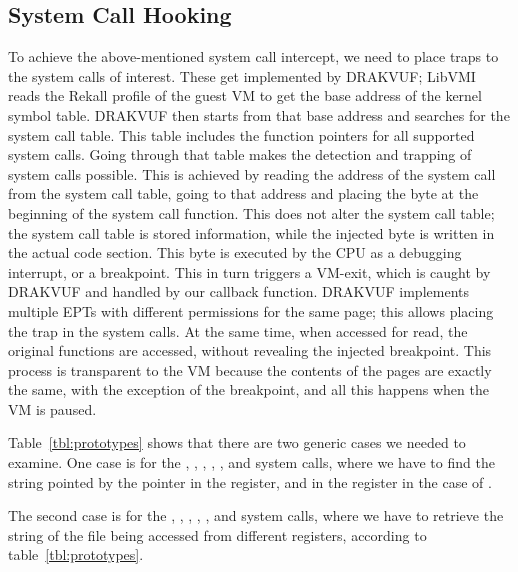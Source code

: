 \begin{table}[ht]
\begin{tabular}{ccccccc}
	\bottomrule
\end{tabular}
\end{table}

\subsection{System Call Hooking}\label{sub:hooking}

To achieve the above-mentioned system call intercept, we need to place traps to the system calls of interest. These get implemented by DRAKVUF; LibVMI reads the Rekall profile of the guest \ac{VM} to get the base address of the kernel symbol table. DRAKVUF then starts from that base address and searches for the system call table. This table includes the function pointers for all supported system calls. Going through that table makes the detection and trapping of system calls possible. This is achieved by reading the address of the system call from the system call table, going to that address and placing the  byte at the beginning of the system call function. This does not alter the system call table; the system call table is stored information, while the injected byte is written in the actual code section. This byte is executed by the \ac{CPU} as a debugging interrupt, or a breakpoint. This in turn triggers a VM-exit, which is caught by DRAKVUF and handled by our callback function. DRAKVUF implements multiple \ac{EPT}s with different permissions for the same page; this allows placing the trap in the system calls. At the same time, when accessed for read, the original functions are accessed, without revealing the injected breakpoint. This process is transparent to the \ac{VM} because the contents of the pages are exactly the same, with the exception of the breakpoint, and all this happens when the \ac{VM} is paused.

\par Table~\ref{tbl:prototypes} shows that there are two generic cases we needed to examine. One case is for the , , , , , and  system calls, where we have to find the string pointed by the pointer in the  register, and in the  register in the case of . 

\par The second case is for the , , , , , and  system calls, where we have to retrieve the string of the file being accessed from different registers, according to table~\ref{tbl:prototypes}. 

